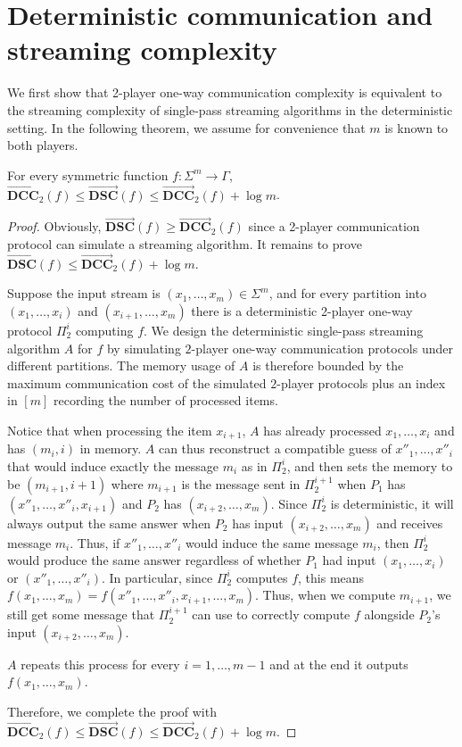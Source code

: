 \documentclass{toc}
\newcommand{\alphabet}{\ensuremath{\Sigma}}
\newcommand{\range}{\ensuremath{\Gamma}}
\newcommand{\dccone}{\ensuremath{\overrightarrow{\mathbf{DCC}}}}
\newcommand{\dscone}{\ensuremath{\overrightarrow{\mathbf{DSC}}}}
\begin{document}
%
%



\section{Deterministic communication and streaming complexity}

We first show that 2-player one-way communication complexity is equivalent to the streaming complexity of single-pass streaming algorithms in the deterministic setting. In the following theorem, we assume for convenience that $m$ is known to both players.

\begin{theorem}\label{thm:dsc-dcc}
For every symmetric function $f:\alphabet^m\to \range$, $\dccone_2(f)\le \dscone(f)\le \dccone_2(f) + \log m$.
\end{theorem}
\begin{proof}
Obviously, $\dscone(f) \ge \dccone_2(f)$ since a 2-player communication protocol can simulate a streaming algorithm.
It remains to prove $\dscone(f) \le \dccone_2(f) + \log m$.

Suppose the input stream is $(x_1,\dots,x_m)\in\alphabet^m$,
and for every partition into $(x_1,\dots, x_i)$ and $(x_{i+1},\dots,x_m)$ there is a deterministic 2-player one-way  protocol $\Pi_2^i$ computing $f$.
We design the deterministic single-pass streaming algorithm $A$ for $f$ by simulating $2$-player one-way communication protocols under different partitions. 
The memory usage of $A$ is therefore bounded by the maximum communication cost of the simulated $2$-player protocols plus an index in $[m]$ recording the number of processed items.

Notice that when processing the item $x_{i+1}$, $A$ has already processed $x_1,\dots, x_i$ and has $(m_i,i)$ in memory. 
$A$ can thus reconstruct a compatible guess of $x''_1,\dots, x''_i$ that would induce exactly the message $m_i$ as in $\Pi_2^i$, and then sets the memory to be $(m_{i+1},i+1)$ where $m_{i+1}$ is the message sent in $\Pi_2^{i+1}$ when $P_1$ has $(x''_1,\dots, x''_i, x_{i+1})$ and $P_2$ has $(x_{i+2},\dots, x_m)$. {\color{black}Since $\Pi_2^i$ is deterministic, it will always output the same answer when $P_2$ has input $(x_{i+2}, \dots, x_m)$ and receives message $m_i$. Thus, if $x''_1, \dots, x''_i$ would induce the same message $m_i$, then $\Pi_2^i$ would produce the same answer regardless of whether $P_1$ had input $(x_1, \dots, x_i)$ or $(x''_1, \dots, x''_i)$. In particular, since $\Pi_2^i$ computes $f$, this means $f(x_1, \dots, x_m) = f(x''_1, \dots, x''_i, x_{i+1}, \dots, x_m)$. Thus, when we compute $m_{i+1}$, we still get some message that $\Pi^{i+1}_2$ can use to correctly compute $f$ alongside $P_2$'s input $(x_{i+2}, \dots, x_m)$.}

$A$ repeats this process for every $i=1,\dots,m-1$ and at the end it outputs $f(x_1,\dots,x_m)$.


Therefore, we complete the proof with $\dccone_2(f)\le \dscone(f) \le \dccone_2(f)+\log m$.
\end{proof}
\end{document}
